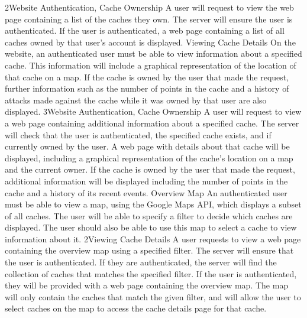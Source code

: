			{2}{Website Authentication, Cache Ownership}
			{A user will request to view the web page containing a list of the
			caches they own.}
			{The server will ensure the user is authenticated.}
			{If the user is authenticated, a web page containing a list of all
			caches owned by that user's account is displayed.}
		\funcreq
			{Viewing Cache Details}
			{On the website, an authenticated user must be able to view
			information about a specified cache. This information will include
			a graphical representation of the location of that cache on a map.
			If the cache is owned by the user that made the request, further
			information such as the number of points in the cache and a history 
			of attacks made against the cache while it was owned by that user
			are also displayed.}
			{3}{Website Authentication, Cache Ownership}
			{A user will request to view a web page containing additional
			information about a specified cache.}
			{The server will check that the user is authenticated, the
			specified cache	exists, and if currently owned by the user.}
			{A web page with details about that cache will be displayed,
			including a graphical representation of the cache's location on a
			map and the current owner. If the cache is owned by the user that
			made the request, additional information will be displayed
			including the number of points in the cache and a history of its
			recent events.}
		\funcreq
			{Overview Map}
			{An authenticated user must be able to view a map, using the Google
			Maps API, which displays a subset of all caches. The user will be
			able to specify a filter to decide which caches are displayed. The
			user should also be able to use this map to select a cache to view
			information about it.}
			{2}{Viewing Cache Details}
			{A user requests to view a web page containing the overview map
			using a specified filter.}
			{The server will ensure that the user is authenticated. If they are
			authenticated, the server will find the collection of caches that
			matches the specified filter.}
			{If the user is authenticated, they will be provided with a web 
			page containing the overview map. The map will only contain the
			caches that match the given filter, and will allow the user to
			select caches on the map to access the cache details page for that
			cache.}
\renewcommand{\arraystretch}{1}
